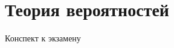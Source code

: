 \section{Теория
вероятностей}\label{ux442ux435ux43eux440ux438ux44f-ux432ux435ux440ux43eux44fux442ux43dux43eux441ux442ux435ux439}

Конспект к экзамену
